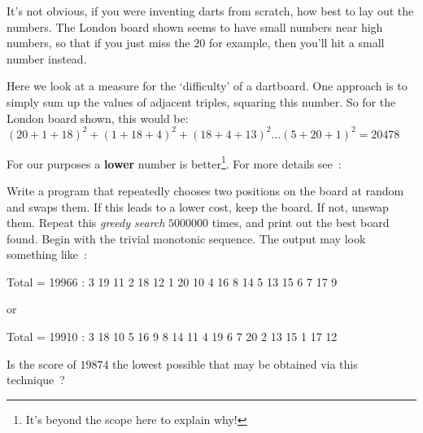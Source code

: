 


It's not obvious, if you were inventing darts from scratch, how best to
lay out the numbers. The London board shown seems to have small numbers near high numbers,
so that if you just miss the $20$ for example, then you'll hit a small number instead.

Here we look at a measure for the `difficulty' of a dartboard.
One approach is to simply sum up the values of adjacent triples, squaring 
this number. So for the London board shown, this would be:
\begin{math}
(20+1+18)^2 + (1+18+4)^2 + (18+4+13)^2 \dots (5+20+1)^2 = 20478
\end{math}

For our purposes a {\bf lower} number is better\footnote{It's beyond
the scope here to explain why!}. For more details see~:

\begin{exercise}
Write a program that repeatedly chooses two
positions on the board at random and swaps them. If this leads to a lower cost,
keep the board. If not, unswap them. Repeat this {\it greedy search}
$5000000$ times, and print out the best board found.
Begin with the trivial monotonic sequence.
The output may look something like~:
\begin{terminaloutput}
Total = 19966 :  3 19 11  2 18 12  1 20 10  4 16  8
14  5 13 15  6  7 17  9 
\end{terminaloutput}
or
\begin{terminaloutput}
Total = 19910 :  3 18 10  5 16  9  8 14 11  4 19  6
7 20  2 13 15  1 17 12 
\end{terminaloutput}

Is the score of $19874$ the lowest possible that may be obtained via this technique~?
\end{exercise}

